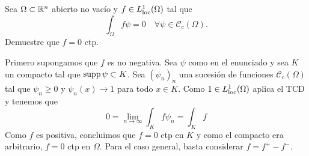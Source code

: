 




\begin{Problema}
	Sea \(\Omega \subset \mathbb{R}^n\) abierto no vacío y \(f\in L^{1}_{\textrm{loc}}(\Omega)\)
	tal que 
	\begin{displaymath}
		\int_{\Omega} f\psi = 0
		\quad \forall \psi \in \mathcal{C}_{c}(\Omega).
	\end{displaymath}
	Demuestre que \(f = 0\) ctp.
\end{Problema}
\begin{Solucion}
	Primero supongamos que \(f\) es no negativa. Sea \(\psi\) como en el
	enunciado y sea \(K\) un compacto tal que \(\textrm{supp}\, \psi \subset K\).
	Sea \((\psi_n)_n\) una sucesión de funciones \(\mathcal{C}_{c}(\Omega)\) tal
	que \(\psi_n \ge 0\) y \(\psi_n(x) \to 1\) para todo \(x\in K\). Como \(1\in
	L^1_{\textrm{loc}}(\Omega)\) aplica el TCD y tenemos que
	\begin{displaymath}
		0
		=
		\lim_{n\to \infty}
		\int_{K} f\psi_n
		=
		\int_{K} f
	\end{displaymath}
	Como \(f\) es positiva, concluimos que \(f=0\) ctp en \(K\) y como el
	compacto era arbitrario, \(f=0\) ctp en \(\Omega\). Para el caso general,
	basta considerar \(f = f^{+} - f^{-}\).
\end{Solucion}


